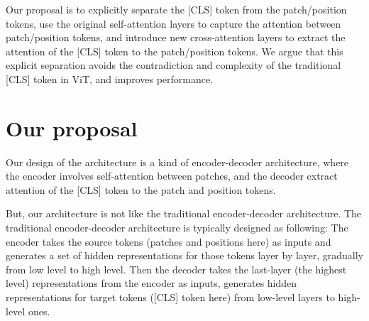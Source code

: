 \documentclass[anon,12pt]{colt2024} %
\begin{document}
Our proposal is to explicitly separate the [CLS] token from the patch/position tokens, use the original self-attention layers to capture the attention between patch/position tokens, and introduce new cross-attention layers to extract the attention of the [CLS] token to the patch/position tokens.
We argue that this explicit separation avoids the contradiction and complexity of the traditional [CLS] token in ViT, and improves performance.

\section{Our proposal}
Our design of the architecture is a kind of encoder-decoder architecture, where the encoder involves self-attention between patches, and the decoder extract attention of the [CLS] token to the patch and position tokens.

But, our architecture is not like the traditional encoder-decoder architecture.
The traditional encoder-decoder architecture is typically designed as following:
The encoder takes the source tokens (patches and positions here) as inputs and generates a set of hidden representations for those tokens layer by layer, gradually from low level to high level. Then the decoder takes the last-layer (the highest level) representations from the encoder as inputs, generates hidden representations for target tokens ([CLS] token here) from low-level layers to high-level ones.

\end{document}
